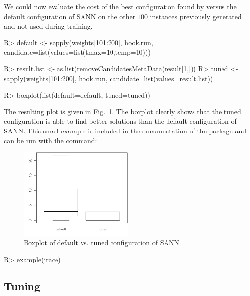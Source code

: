 \documentclass[article,a4paper,nojss,notitle]{jss}
\newcommand{\irace}{\pkg{irace}\xspace}
\newcommand{\SoftwarePackage}{\pkg}
\newcommand{\ACOTSP}{\SoftwarePackage{ACOTSP}\xspace}
\begin{document}
We could now evaluate the cost of the best configuration found by
\irace versus the default configuration of SANN on the other $100$
instances previously generated and not used during training.

\begin{CodeChunk}
\begin{CodeInput}
R> default <- sapply(weights[101:200], hook.run,
                  candidate=list(values=list(tmax=10,temp=10)))

R> result.list <- as.list(removeCandidatesMetaData(result[1,]))
R> tuned <- sapply(weights[101:200], hook.run, candidate=list(values=result.list))

R> boxplot(list(default=default, tuned=tuned))
\end{CodeInput}
\end{CodeChunk}      

The resulting plot is given in Fig.~\ref{fig:boxplot_sann}. The
boxplot clearly shows that the tuned configuration is able to find
better solutions than the default configuration of SANN. This small example is included in the documentation of the \irace package and can be run with the command:



\begin{figure}
  \centering
  \includegraphics[width=0.5\textwidth]{boxplot-sann.pdf}
  \caption{Boxplot of default vs. tuned configuration of SANN}
  \label{fig:boxplot_sann}
\end{figure}

\begin{CodeChunk}
\begin{CodeInput}
R> example(irace)
\end{CodeInput}
\end{CodeChunk}      


\subsection[Tuning ACOTSP]{Tuning \ACOTSP}
\end{document}
